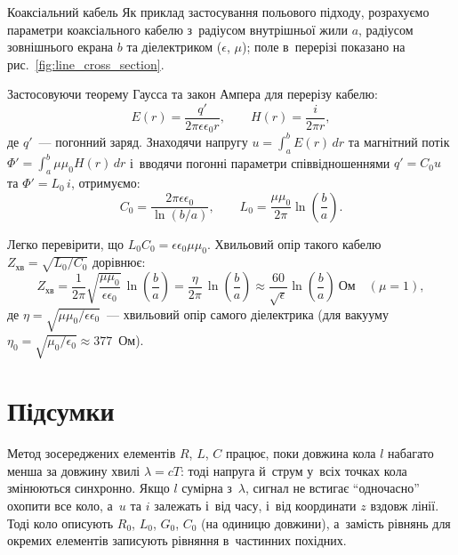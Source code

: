 \begin{Example}{Коаксіальний кабель}
	Як приклад застосування польового підходу, розрахуємо параметри коаксіального кабелю з~радіусом внутрішньої жили $a$, радіусом зовнішнього екрана $b$ та діелектриком ($\epsilon$, $\mu$); поле в~перерізі показано на рис.~\ref{fig:line_cross_section}.

	Застосовуючи теорему Гаусса та закон Ампера для перерізу кабелю:
	\begin{equation}
		E(r) = \frac{q'}{2\pi\epsilon\epsilon_0 r}, \qquad H(r) = \frac{i}{2\pi r},
	\end{equation}
	де $q'$~--- погонний заряд. Знаходячи напругу $u = \int_a^b E(r)\,dr$ та магнітний потік $\Phi' = \int_a^b \mu\mu_0 H(r)\,dr$ і~вводячи погонні параметри співвідношеннями $q' = C_0 u$ та $\Phi' = L_0\,i$, отримуємо:
	\begin{equation}\label{eq:C0L0}
		C_0 = \frac{2\pi\epsilon\epsilon_0}{\ln(b/a)}, \qquad
		L_0 = \frac{\mu\mu_0}{2\pi}\ln\left(\frac{b}{a}\right).
	\end{equation}

	Легко перевірити, що $L_0 C_0 = \epsilon\epsilon_0\mu\mu_0$. Хвильовий опір такого кабелю $Z_{\text{хв}} = \sqrt{L_0/C_0}$ дорівнює:
	\begin{equation}\label{eq:coax_impedance}
		Z_{\text{хв}} = \frac{1}{2\pi}\sqrt{\frac{\mu\mu_0}{\epsilon\epsilon_0}}\,\ln\left(\frac{b}{a}\right)
		= \frac{\eta}{2\pi}\,\ln\left(\frac{b}{a}\right) \approx \frac{60}{\sqrt{\epsilon}}\ln\left(\frac{b}{a}\right)~\text{Ом}\quad(\mu=1),
	\end{equation}
	де $\eta = \sqrt{\mu\mu_0/\epsilon\epsilon_0}$~--- хвильовий опір самого діелектрика (для вакууму $\eta_0 = \sqrt{\mu_0/\epsilon_0}\approx377$~Ом).
\end{Example}

\section*{Підсумки}
{}

Метод зосереджених елементів $R$, $L$, $C$ працює, поки довжина кола $l$ набагато менша за довжину хвилі $\lambda=cT$: тоді напруга й~струм у~всіх точках кола змінюються синхронно. Якщо $l$ сумірна з~$\lambda$, сигнал не встигає \enquote{одночасно} охопити все коло, а~$u$ та $i$ залежать і~від часу, і~від координати $z$ вздовж лінії. Тоді коло описують  $R_0$, $L_0$, $G_0$, $C_0$ (на одиницю довжини), а~замість рівнянь для окремих елементів записують рівняння в~частинних похідних.

